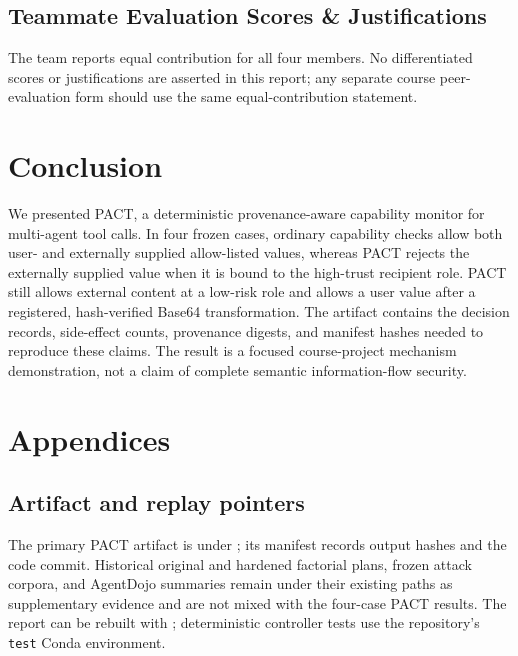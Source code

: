 \documentclass[journal]{IEEEtran}
\begin{document}
\subsection{Teammate Evaluation Scores \& Justifications}

The team reports equal contribution for all four members.  No differentiated
scores or justifications are asserted in this report; any separate course
peer-evaluation form should use the same equal-contribution statement.

\section{Conclusion}

We presented PACT, a deterministic provenance-aware capability monitor for
multi-agent tool calls.  In four frozen cases, ordinary capability checks allow
both user- and externally supplied allow-listed values, whereas PACT rejects
the externally supplied value when it is bound to the high-trust recipient
role.  PACT still allows external content at a low-risk role and allows a user
value after a registered, hash-verified Base64 transformation.  The artifact
contains the decision records, side-effect counts, provenance digests, and
manifest hashes needed to reproduce these claims.  The result is a focused
course-project mechanism demonstration, not a claim of complete semantic
information-flow security.

\nocite{*}



\newpage
\section*{Appendices}

\subsection*{Artifact and replay pointers}

The primary PACT artifact is under ; its
manifest records output hashes and the code commit.  Historical original and
hardened factorial plans, frozen attack corpora, and AgentDojo summaries remain
under their existing paths as supplementary evidence and are not mixed with
the four-case PACT results.  The report can be rebuilt with
; deterministic controller tests use the
repository's \texttt{test} Conda environment.
\end{document}
